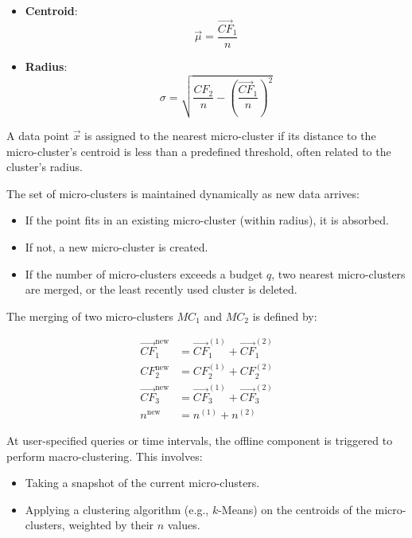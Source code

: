 \begin{itemize}
    \item \textbf{Centroid}:
          \begin{equation}
              \vec{\mu} = \frac{\vec{CF}_1}{n}
          \end{equation}
    \item \textbf{Radius}:
          \begin{equation}
              \sigma = \sqrt{ \frac{CF_2}{n} - \left( \frac{\vec{CF}_1}{n} \right)^2 }
          \end{equation}
\end{itemize}

A data point $\vec{x}$ is assigned to the nearest micro-cluster if its distance
to the micro-cluster's centroid is less than a predefined threshold, often
related to the cluster's radius.

The set of micro-clusters is maintained dynamically as new data arrives:

\begin{itemize}
    \item If the point fits in an existing micro-cluster (within radius), it is absorbed.
    \item If not, a new micro-cluster is created.
    \item If the number of micro-clusters exceeds a budget $q$, two nearest
          micro-clusters are merged, or the least recently used cluster is deleted.
\end{itemize}

The merging of two micro-clusters $MC_1$ and $MC_2$ is defined by:

\begin{align}
    \vec{CF}_1^{\text{new}} & = \vec{CF}_1^{(1)} + \vec{CF}_1^{(2)} \\
    CF_2^{\text{new}}       & = CF_2^{(1)} + CF_2^{(2)}             \\
    \vec{CF}_3^{\text{new}} & = \vec{CF}_3^{(1)} + \vec{CF}_3^{(2)} \\
    n^{\text{new}}          & = n^{(1)} + n^{(2)}
\end{align}

At user-specified queries or time intervals, the offline component is triggered
to perform macro-clustering. This involves:

\begin{itemize}
    \item Taking a snapshot of the current micro-clusters.
    \item Applying a clustering algorithm (e.g., $k$-Means) on the centroids of the
          micro-clusters, weighted by their $n$ values.
\end{itemize}

